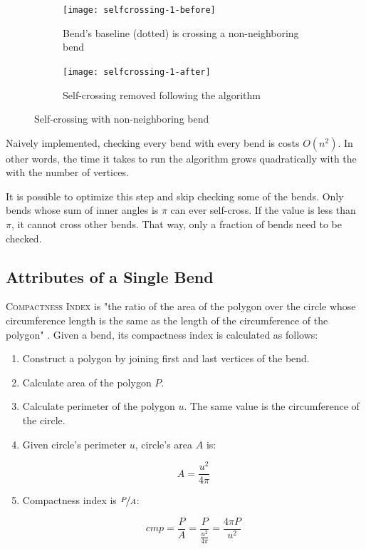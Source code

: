 \documentclass[a4paper]{article}
\begin{document}
\begin{figure}[h]
    \centering
    \begin{subfigure}[b]{.4\textwidth}
        \texttt{[image: selfcrossing-1-before]}
        \caption{Bend's baseline (dotted) is crossing a non-neighboring bend}
    \end{subfigure}
    \hfill
    \begin{subfigure}[b]{.4\textwidth}
        \texttt{[image: selfcrossing-1-after]}
        \caption{Self-crossing removed following the algorithm}
    \end{subfigure}
    \caption{Self-crossing with non-neighboring bend}
    \label{fig:selfcrossing-1-non-neighbor}
\end{figure}

Naively implemented, checking every bend with every bend is costs $O(n^2)$. In
other words, the time it takes to run the algorithm grows quadratically with
the with the number of vertices.

It is possible to optimize this step and skip checking some of the bends. Only
bends whose sum of inner angles is $\pi$ can ever self-cross. If the value is
less than $\pi$, it cannot cross other bends. That way, only a fraction of
bends need to be checked.

\subsection{Attributes of a Single Bend}

\textsc{Compactness Index} is "the ratio of the area of the polygon over the
circle whose circumference length is the same as the length of the
circumference of the polygon" \cite{wang1998line}. Given a bend, its
compactness index is calculated as follows:

\begin{enumerate}

  \item Construct a polygon by joining first and last vertices of the bend.

  \item Calculate area of the polygon $P$.

  \item Calculate perimeter of the polygon $u$. The same value is the
    circumference of the circle.

  \item Given circle's perimeter $u$, circle's area $A$ is:

    \[
      A = \frac{u^2}{4\pi}
    \]

  \item Compactness index is $\nicefrac{P}{A}$:

    \[
      cmp = \frac{P}{A} = \frac{P}{ \frac{u^2}{4\pi} } = \frac{4\pi P}{u^2}
    \]

\end{enumerate}
\end{document}

